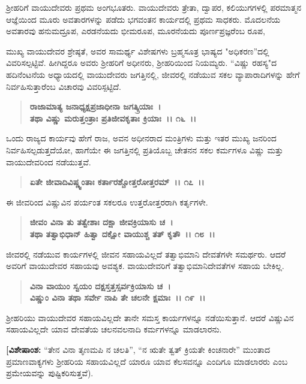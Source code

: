 ಶ‍್ರೀಹರಿಗೆ ವಾಯುದೇವರು ಪ್ರಥಮ ಅಂಗಭೂತರು. ವಾಯುದೇವರು ತ್ರೇತಾ, ದ್ವಾಪರ, ಕಲಿಯುಗಗಳಲ್ಲಿ ಪರಮಾತ್ಮನ ಆಜ್ಞೆಯಿಂದ ಮೂರು ಅವತಾರಗಳನ್ನು ಪಡೆದು ಭಗವಂತನ ಕಾರ್ಯದಲ್ಲಿ ಪ್ರಥಮ ಸಾಧಕರು. ಮೊದಲನೆಯ ಅವತಾರವು ಹನುಮದ್ರೂಪ, ಎರಡನೆಯದು ಭೀಮರೂಪ, ಮೂರನೆಯದು ಪೂರ್ಣಪ್ರಜ್ಞರೆಂಬ ರೂಪ,

ಮುಖ್ಯ ವಾಯುದೇವರ ಶ್ರೇಷ್ಠತೆ, ಅವರ ಸಾಮರ್ಥ್ಯ ವಿಶೇಷಗಳು ಬ್ರಹ್ಮಸೂತ್ರ ಭಾಷ್ಯದ "ಅಧಿಕರಣ”ದಲ್ಲಿ ವಿವರಿಸಲ್ಪಟ್ಟಿವೆ. ಹೀಗಿದ್ದರೂ ಅವರು ಶ‍್ರೀಹರಿಗೆ ಅಧೀನರು, ಶ‍್ರೀಹರಿಯಿಂದ ನಿಯಮ್ಯರು. “ವಿಷ್ಣು ರಹಸ್ಯ"ದ ಹದಿನೆಂಟನೆಯ ಅಧ್ಯಾಯದಲ್ಲಿ ವಾಯುದೇವರು ಜಗತ್ತಿನಲ್ಲಿ, ಜೀವರಲ್ಲಿ ನಡೆಯುವ ಸಕಲ ವ್ಯಾಪಾರಾದಿಗಳನ್ನು ಹೇಗೆ ನಿರ್ವಹಿಸುತ್ತಾರೆಂಬ ವಿಚಾರವು ವಿವರಿಸ್ಪಟ್ಟಿದೆ.

\begin{verse}
\textbf{ರಾಜಾಮಾತ್ಯ ಜನಾಧ್ಯಕ್ಷಪ್ರಜಾಧೀನಾ ಜಗತ್ಕ್ರಿಯಾಃ~।}\\\textbf{ತಥಾ ವಿಷ್ಣು ಮರುತ್ತಂತ್ರಾಃ ಪ್ರತಿಜೀವಕೃತಾಃ ಕ್ರಿಯಾಃ~।। ೧೬~।।}
\end{verse}

ಒಂದು ರಾಜ್ಯದ ಕಾರ್ಯವು ಹೇಗೆ ರಾಜ, ಅವನ ಅಧೀನರಾದ ಮಂತ್ರಿಗಳು ಮತ್ತು ಇತರ ಮುಖ್ಯ ಜನರಿಂದ ನಿರ್ವಹಿಸಲ್ಪಡುತ್ತದೆಯೋ, ಹಾಗೆಯೇ ಈ ಜಗತ್ತಿನಲ್ಲಿ ಪ್ರತಿಯೊಬ್ಬ ಚೇತನನ ಸಕಲ ಕರ್ಮಗಳೂ ವಿಷ್ಣು ಮತ್ತು ವಾಯುದೇವರಿಂದ ನಡೆಯುತ್ತವೆ.

\begin{verse}
\textbf{ಏತೇ ಜೀವಾದಿವಿಷ್ಣ್ವಂತಾಃ ಕರ್ತಾರಶ್ಚೋತ್ತರೋತ್ತರಮ್~।। ೧೭~।।}
\end{verse}

ಈ ಜೀವರಿಂದ ವಿಷ್ಣುವಿನ ಪರ್ಯಂತ ಸಕಲರೂ ಉತ್ತರೋತ್ತರರಾಗಿ ಕರ್ತೃಗಳೇ.

\begin{verse}
\textbf{ಜೀವಂ ವಿನಾ ತು ತತ್ವೇಶಾಃ ದಕ್ಷಾ ಜೀವಕ್ರಿಯಾಸು ಚ~।}\\\textbf{ತಥಾ ತತ್ವಾಭಿಧಾನ್ ಹಿತ್ವಾ ದಕ್ಷೋ ವಾಯುಶ್ಚ ತತ್ ಕೃತೌ~।। ೧೮~।।}
\end{verse}

ಜೀವರಲ್ಲಿ ನಡೆಯುವ ಕಾರ್ಯಗಳಲ್ಲಿ ಜೀವನ ಸಹಾಯವಿಲ್ಲದೆ ತತ್ವಾಭಿಮಾನಿ ದೇವತೆಗಳೇ ಸಮರ್ಥರು. ಆದರೆ ಅವರಿಗೆ ವಾಯುದೇವರ ಸಹಾಯವು ಅವಶ್ಯಕ. ವಾಯುದೇವರಿಗೆ ತತ್ವಾಭಿಮಾನಿದೇವತೆಗಳ ಸಹಾಯ ಬೇಕಿಲ್ಲ.

\begin{verse}
\textbf{ವಿನಾ ವಾಯುಂ ಸ್ವಯಂ ದಕ್ಷಸ್ತತ್ತಸ್ಸರ್ವಕ್ರಿಯಾಸು ಚ~।}\\\textbf{ವಿಷ್ಣುಂ ವಿನಾ ತಥಾ ಸರ್ವೇ ನಾಪಿ ತೇ ಚಲನೇ ಕ್ಷಮಾಃ~।। ೧೯~।।}
\end{verse}

ಶ‍್ರೀಹರಿಯು ವಾಯುದೇವರ ಸಹಾಯವಿಲ್ಲದೇ ತಾನೇ ಸಮಸ್ತ ಕಾರ್ಯಗಳನ್ನೂ ನಡೆಯಿಸುತ್ತಾನೆ. ಆದರೆ ವಿಷ್ಣುವಿನ ಸಹಾಯವಿಲ್ಲದೇ ಯಾವ ದೇವತೆಯ ಚಲನವಲನಾದಿ ಕರ್ಮಗಳನ್ನೂ ಮಾಡಲಾರನು.

\textbf{[ವಿಶೇಷಾಂಶ:} “ತೇನ ವಿನಾ ತೃಣಮಪಿ ನ ಚಲತಿ”, “ನ ಋತೇ ತ್ವತ್ ಕ್ರಿಯತೇ ಕಿಂಚನಾರೇ'' ಮುಂತಾದ ಪ್ರಮಾಣವಾಕ್ಯಗಳು ಶ‍್ರೀಹರಿಯ ಸಹಾಯವಿಲ್ಲದೆ ಯಾರೂ ಯಾವ ಕೆಲಸವನ್ನೂ ಎಂದಿಗೂ ಮಾಡಲಾರರು ಎಂಬ ಪ್ರಮೇಯವನ್ನು ಪುಷ್ಟಿಕರಿಸುತ್ತವೆ).

